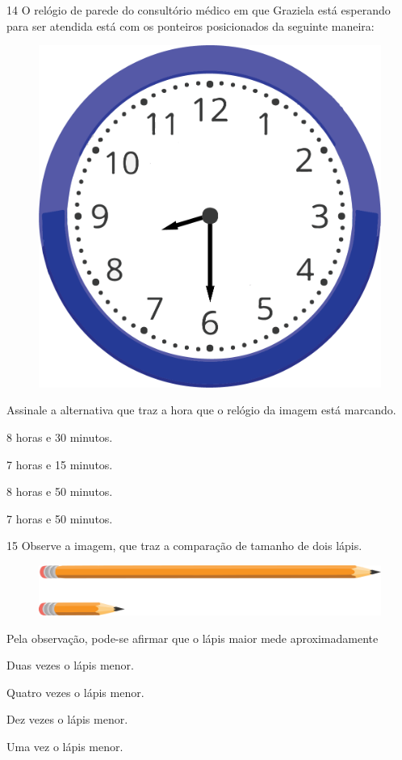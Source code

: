 \pagebreak
\num{14} O relógio de parede do consultório médico em que Graziela está esperando
para ser atendida está com os ponteiros posicionados da seguinte maneira:

\begin{figure}[htpb!]
\centering
\includegraphics[width=.3\textwidth]{./media/image100.png}
\end{figure}

Assinale a alternativa que traz a hora que o relógio da imagem está marcando.

\begin{escolha}
\item
  8 horas e 30 minutos.
\item
  7 horas e 15 minutos.
\item
  8 horas e 50 minutos.
\item
  7 horas e 50 minutos.
\end{escolha}

\pagebreak

\num{15} Observe a imagem, que traz a comparação de tamanho de dois lápis.

\begin{figure}[htpb!]
\centering
\includegraphics[width=\textwidth]{./media/image101.png}
\end{figure}

Pela observação, pode-se afirmar que o lápis maior mede aproximadamente

\begin{escolha}
\item
  Duas vezes o lápis menor.
\item
  Quatro vezes o lápis menor.
\item
  Dez vezes o lápis menor.
\item
  Uma vez o lápis menor.
\end{escolha}
\pagebreak

